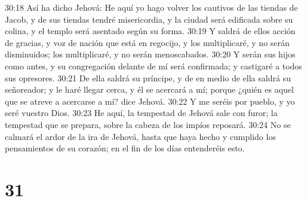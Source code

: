 30:18 Así ha dicho Jehová: He aquí yo hago volver los cautivos de las tiendas de Jacob, y de sus tiendas tendré misericordia, y la ciudad será edificada sobre su colina, y el templo será asentado según su forma.  
30:19 Y saldrá de ellos acción de gracias, y voz de nación que está en regocijo, y los multiplicaré, y no serán disminuidos; los multiplicaré, y no serán menoscabados.  
30:20 Y serán sus hijos como antes, y su congregación delante de mí será confirmada; y castigaré a todos sus opresores.  
30:21 De ella saldrá su príncipe, y de en medio de ella saldrá su señoreador; y le haré llegar cerca, y él se acercará a mí; porque ¿quién es aquel que se atreve a acercarse a mí? dice Jehová.  
30:22 Y me seréis por pueblo, y yo seré vuestro Dios.  
30:23 He aquí, la tempestad de Jehová sale con furor; la tempestad que se prepara, sobre la cabeza de los impíos reposará.  
30:24 No se calmará el ardor de la ira de Jehová, hasta que haya hecho y cumplido los pensamientos de su corazón; en el fin de los días entenderéis esto.  

\chapter{31}

